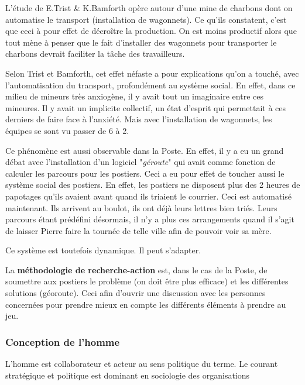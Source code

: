 \documentclass[12pt]{article}
\begin{document}
	L'étude de E.Trist \& K.Bamforth opère autour d'une mine de charbons dont on automatise le transport (installation de wagonnets). Ce qu'ils constatent, c'est que ceci à pour effet de décroître la production. On est moins productif alors que tout mène à penser que le fait d'installer des wagonnets pour transporter le charbons devrait faciliter la tâche des travailleurs. \newline
	
	Selon Trist et Bamforth, cet effet néfaste a pour explications qu'on a touché, avec l'automatisation du transport, profondément au système social. En effet, dans ce milieu de mineurs très anxiogène, il y avait tout un imaginaire entre ces mineures. Il y avait un implicite collectif, un état d'esprit qui permettait à ces derniers de faire face à l'anxiété. Mais avec l'installation de wagonnets, les équipes se sont vu passer de 6 à 2. \newline
	
	Ce phénomène est aussi observable dans la Poste. En effet, il y a eu un grand débat avec l'installation d'un logiciel "\textit{géroute}" qui avait comme fonction de calculer les parcours pour les postiers. Ceci a eu pour effet de toucher aussi le système social des postiers. En effet, les postiers ne disposent plus des 2 heures de papotages qu'ils avaient avant quand ils triaient le courrier. Ceci est automatisé maintenant. Ils arrivent au boulot, ils ont déjà leurs lettres bien triés. Leurs parcours étant prédéfini désormais, il n'y a plus ces arrangements quand il s'agit de laisser Pierre faire la tournée de telle ville afin de pouvoir voir sa mère. \newline
	
	Ce système est toutefois dynamique. Il peut s'adapter.\newline
	
	La \textbf{méthodologie de recherche-action} est, dans le cas de la Poste, de soumettre aux postiers le problème (on doit être plus efficace) et les différentes solutions (géoroute). Ceci afin d'ouvrir une discussion avec les personnes concernées pour prendre mieux en compte les différents éléments à prendre au jeu. 
	
	
	\subsubsection{Conception de l'homme}
	L'homme est collaborateur et acteur au sens politique du terme. Le courant stratégique et politique est dominant en sociologie des organisations
	
\end{document}
